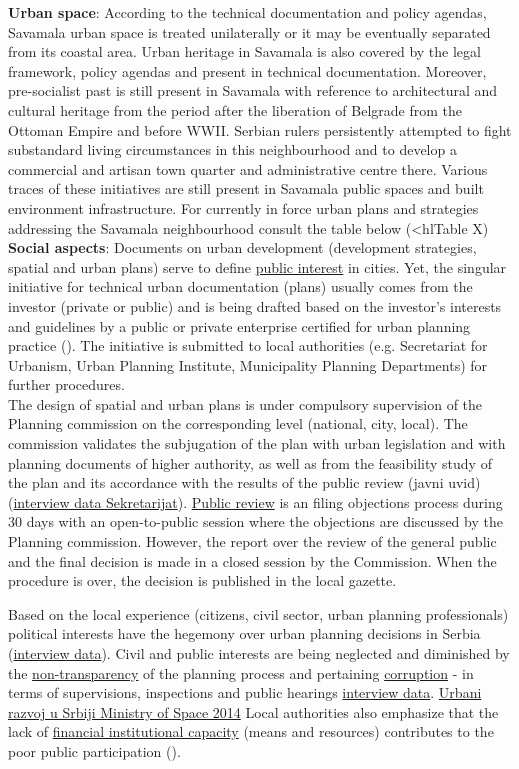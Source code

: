 \documentclass[11pt]{report}
\begin{document}
\begin{itemize}
\textbf{Urban space}:
According to the technical documentation and policy agendas, Savamala urban space is treated unilaterally or it may be eventually separated from its coastal area.
Urban heritage in Savamala is also covered by the legal framework, policy agendas and present in technical documentation.
Moreover, pre-socialist past is still present in Savamala with reference to architectural and cultural heritage from the period after the liberation of Belgrade from the Ottoman Empire and before WWII.
Serbian rulers persistently attempted to fight substandard living circumstances in this neighbourhood and to develop a commercial and artisan town quarter and administrative centre there.
Various traces of these initiatives are still present in Savamala public spaces and built environment infrastructure.  
For currently in force urban plans and strategies addressing the Savamala neighbourhood consult the table below (<hl{Table X}) %
\\

\textbf{Social aspects}:
Documents on urban development (development strategies, spatial and urban plans) serve to define  \underline{public interest} in cities.
Yet, the singular initiative for technical urban documentation (plans) usually comes from the investor (private or public) and is being drafted based on the investor's interests and guidelines by a public or private enterprise certified for urban planning practice (\cite{Urbani razvoj u Srbiji Ministry of Space 2014}). The initiative is submitted to local authorities (e.g. Secretariat for Urbanism, Urban Planning Institute, Municipality Planning Departments) for further procedures.
\\
The design of spatial and urban plans is under compulsory supervision of the Planning commission on the corresponding level (national, city, local). The commission validates the subjugation of the plan with urban legislation and with planning documents of higher authority, as well as from the feasibility study of the plan and its accordance with the results of the public review (javni uvid) (\href{}{interview data Sekretarijat}). 
\underline{Public review} is an filing objections process during 30 days with an open-to-public session where the objections are discussed by the Planning commission. However, the report over the review of the general public and the final decision is made in a closed session by the Commission. 
When the procedure is over, the decision is published in the local gazette.

Based on the local experience (citizens, civil sector, urban planning professionals) political interests have the hegemony over urban planning decisions in Serbia (\href{}{interview data}).
Civil and public interests are being neglected and diminished by the \underline{non-transparency} of the planning process and pertaining \underline{corruption} - in terms of supervisions, inspections and public hearings \href{}{interview data}.
\href{}{Urbani razvoj u Srbiji Ministry of Space 2014}
Local authorities also emphasize that the lack of \underline{financial institutional capacity} (means and resources) contributes to the poor public participation (\cite{Urbani razvoj u Srbiji Ministry of Space 2014}).


\end{itemize}
\end{document}
